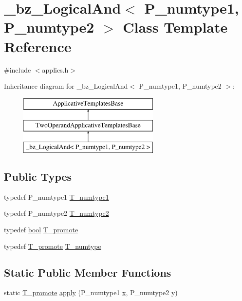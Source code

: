 \hypertarget{class__bz__LogicalAnd}{}\section{\+\_\+bz\+\_\+\+Logical\+And$<$ P\+\_\+numtype1, P\+\_\+numtype2 $>$ Class Template Reference}
\label{class__bz__LogicalAnd}


{\ttfamily \#include $<$applics.\+h$>$}

Inheritance diagram for \+\_\+bz\+\_\+\+Logical\+And$<$ P\+\_\+numtype1, P\+\_\+numtype2 $>$\+:\begin{figure}[H]
\begin{center}
\leavevmode
\includegraphics[height=3.000000cm]{class__bz__LogicalAnd}
\end{center}
\end{figure}
\subsection*{Public Types}
\begin{DoxyCompactItemize}
\item 
typedef P\+\_\+numtype1 \hyperlink{class__bz__LogicalAnd_a8fe9a073a95e89d5873a068e7a286baf}{T\+\_\+numtype1}
\item 
typedef P\+\_\+numtype2 \hyperlink{class__bz__LogicalAnd_aa4ac9c330746b4714756c81a23056228}{T\+\_\+numtype2}
\item 
typedef \hyperlink{compiler_8h_abb452686968e48b67397da5f97445f5b}{bool} \hyperlink{class__bz__LogicalAnd_a095005c0ece2a2f0766438835df2ec9b}{T\+\_\+promote}
\item 
typedef \hyperlink{class__bz__LogicalAnd_a095005c0ece2a2f0766438835df2ec9b}{T\+\_\+promote} \hyperlink{class__bz__LogicalAnd_a36060bfd17404e848493fe49e4b4f58e}{T\+\_\+numtype}
\end{DoxyCompactItemize}
\subsection*{Static Public Member Functions}
\begin{DoxyCompactItemize}
\item 
static \hyperlink{class__bz__LogicalAnd_a095005c0ece2a2f0766438835df2ec9b}{T\+\_\+promote} \hyperlink{class__bz__LogicalAnd_ae797920ac6dd826c6dd2b3cecc2cf868}{apply} (P\+\_\+numtype1 \hyperlink{vecnorm1_8cc_ac73eed9e41ec09d58f112f06c2d6cb63}{x}, P\+\_\+numtype2 y)
\end{DoxyCompactItemize}


